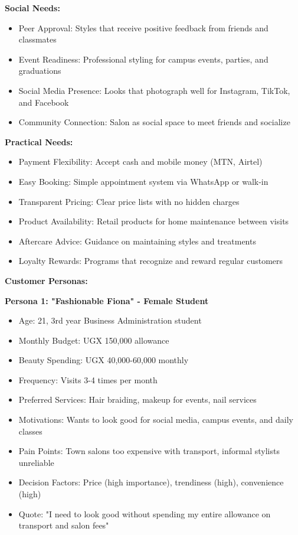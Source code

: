 \textbf{Social Needs:}
\begin{itemize}[leftmargin=2em]
    \item Peer Approval: Styles that receive positive feedback from friends and classmates
    \item Event Readiness: Professional styling for campus events, parties, and graduations
    \item Social Media Presence: Looks that photograph well for Instagram, TikTok, and Facebook
    \item Community Connection: Salon as social space to meet friends and socialize
\end{itemize}

\textbf{Practical Needs:}
\begin{itemize}[leftmargin=2em]
    \item Payment Flexibility: Accept cash and mobile money (MTN, Airtel)
    \item Easy Booking: Simple appointment system via WhatsApp or walk-in
    \item Transparent Pricing: Clear price lists with no hidden charges
    \item Product Availability: Retail products for home maintenance between visits
    \item Aftercare Advice: Guidance on maintaining styles and treatments
    \item Loyalty Rewards: Programs that recognize and reward regular customers
\end{itemize}

\vspace{1em}

\textbf{Customer Personas:}

\textbf{Persona 1: "Fashionable Fiona" - Female Student}
\begin{itemize}[leftmargin=2em]
    \item Age: 21, 3rd year Business Administration student
    \item Monthly Budget: UGX 150,000 allowance
    \item Beauty Spending: UGX 40,000-60,000 monthly
    \item Frequency: Visits 3-4 times per month
    \item Preferred Services: Hair braiding, makeup for events, nail services
    \item Motivations: Wants to look good for social media, campus events, and daily classes
    \item Pain Points: Town salons too expensive with transport, informal stylists unreliable
    \item Decision Factors: Price (high importance), trendiness (high), convenience (high)
    \item Quote: "I need to look good without spending my entire allowance on transport and salon fees"
\end{itemize}

